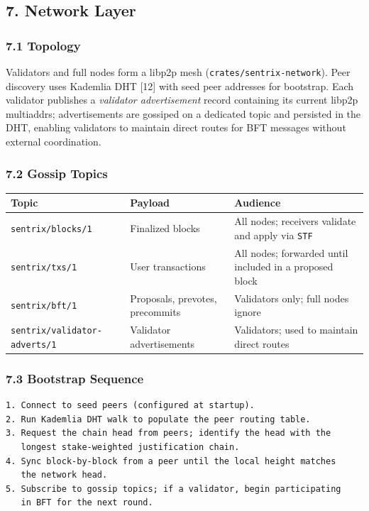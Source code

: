 \documentclass[11pt,a4paper]{article}
\begin{document}
\hypertarget{7-network-layer}{%
\subsection{7. Network Layer}\label{7-network-layer}}

\hypertarget{71-topology}{%
\subsubsection{7.1 Topology}\label{71-topology}}

Validators and full nodes form a libp2p mesh
(\texttt{crates/sentrix-network}). Peer discovery uses Kademlia DHT
{[}12{]} with seed peer addresses for bootstrap. Each validator
publishes a \emph{validator advertisement} record containing its current
libp2p multiaddrs; advertisements are gossiped on a dedicated topic and
persisted in the DHT, enabling validators to maintain direct routes for
BFT messages without external coordination.

\hypertarget{72-gossip-topics}{%
\subsubsection{7.2 Gossip Topics}\label{72-gossip-topics}}

\begin{longtable}[]{@{}lll@{}}
\toprule\noalign{}
Topic & Payload & Audience \\
\midrule\noalign{}
\endhead
\bottomrule\noalign{}
\endlastfoot
\texttt{sentrix/blocks/1} & Finalized blocks & All nodes; receivers
validate and apply via \texttt{STF} \\
\texttt{sentrix/txs/1} & User transactions & All nodes; forwarded until
included in a proposed block \\
\texttt{sentrix/bft/1} & Proposals, prevotes, precommits & Validators
only; full nodes ignore \\
\texttt{sentrix/validator-adverts/1} & Validator advertisements &
Validators; used to maintain direct routes \\
\end{longtable}

\hypertarget{73-bootstrap-sequence}{%
\subsubsection{7.3 Bootstrap Sequence}\label{73-bootstrap-sequence}}

\begin{verbatim}
1. Connect to seed peers (configured at startup).
2. Run Kademlia DHT walk to populate the peer routing table.
3. Request the chain head from peers; identify the head with the
   longest stake-weighted justification chain.
4. Sync block-by-block from a peer until the local height matches
   the network head.
5. Subscribe to gossip topics; if a validator, begin participating
   in BFT for the next round.
\end{verbatim}
\end{document}
